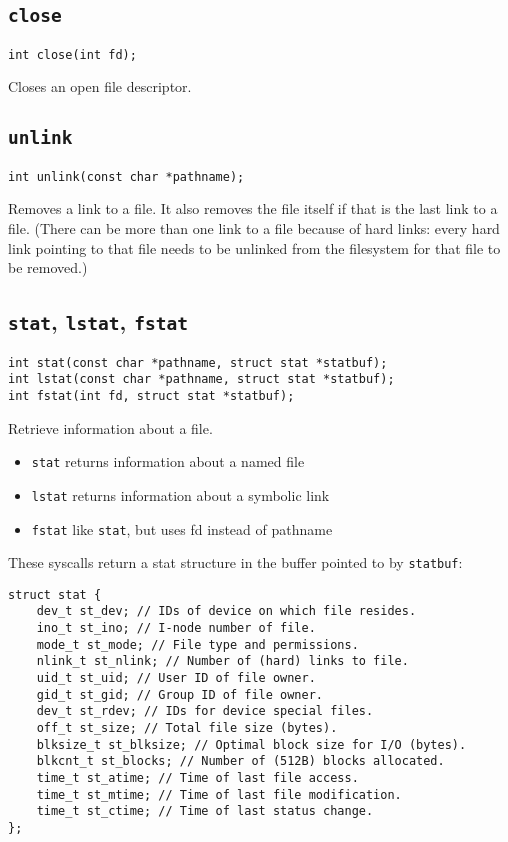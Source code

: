\documentclass{article}
\begin{document}
\subsection{\texttt{close}}

\begin{verbatim}
int close(int fd);
\end{verbatim}

Closes an open file descriptor.


\subsection{\texttt{unlink}}

\begin{verbatim}
int unlink(const char *pathname);
\end{verbatim}

Removes a link to a file. It also removes the file itself if that is the last link to a file. (There can be more than one link to a file because of hard links: every hard link pointing to that file needs to be unlinked from the filesystem for that file to be removed.)

\subsection{\texttt{stat}, \texttt{lstat}, \texttt{fstat}}

\begin{verbatim}
int stat(const char *pathname, struct stat *statbuf);
int lstat(const char *pathname, struct stat *statbuf);
int fstat(int fd, struct stat *statbuf);
\end{verbatim}

Retrieve information about a file.

\begin{itemize}
    \item \texttt{stat} returns information about a named file
    \item \texttt{lstat} returns information about a symbolic link 
    \item \texttt{fstat} like \texttt{stat}, but uses fd instead of pathname 
\end{itemize}

These syscalls return a stat structure in the buffer pointed to by \texttt{statbuf}:

\begin{verbatim}
struct stat {
    dev_t st_dev; // IDs of device on which file resides.
    ino_t st_ino; // I-node number of file.
    mode_t st_mode; // File type and permissions.
    nlink_t st_nlink; // Number of (hard) links to file.
    uid_t st_uid; // User ID of file owner.
    gid_t st_gid; // Group ID of file owner.
    dev_t st_rdev; // IDs for device special files.
    off_t st_size; // Total file size (bytes).
    blksize_t st_blksize; // Optimal block size for I/O (bytes).
    blkcnt_t st_blocks; // Number of (512B) blocks allocated.
    time_t st_atime; // Time of last file access.
    time_t st_mtime; // Time of last file modification.
    time_t st_ctime; // Time of last status change.
};
\end{verbatim}
\end{document}
